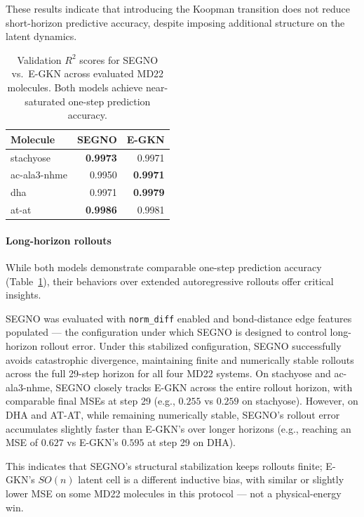 \documentclass{article}
\begin{document}
These results indicate that introducing the Koopman transition does not reduce short-horizon predictive accuracy, despite imposing additional structure on the latent dynamics.

\begin{table}[htbp]
\centering
\begin{tabular}{lrr}
\toprule
\textbf{Molecule} & \textbf{SEGNO} & \textbf{E-GKN} \\
\midrule
stachyose & \textbf{0.9973} & 0.9971 \\
ac-ala3-nhme & 0.9950 & \textbf{0.9971} \\
dha & 0.9971 & \textbf{0.9979} \\
at-at & \textbf{0.9986} & 0.9981 \\
\bottomrule
\end{tabular}
\caption{Validation $R^2$ scores for SEGNO vs.\ E-GKN across evaluated MD22 molecules. Both models achieve near-saturated one-step prediction accuracy.}
\label{tab:segno_r2}
\end{table}

\paragraph{Long-horizon rollouts}
While both models demonstrate comparable one-step prediction accuracy (Table~\ref{tab:segno_r2}), their behaviors over extended autoregressive rollouts offer critical insights.

SEGNO was evaluated with \texttt{norm\_diff} enabled and bond-distance edge features populated --- the configuration under which SEGNO is designed to control long-horizon rollout error. Under this stabilized configuration, SEGNO successfully avoids catastrophic divergence, maintaining finite and numerically stable rollouts across the full 29-step horizon for all four MD22 systems. On stachyose and ac-ala3-nhme, SEGNO closely tracks E-GKN across the entire rollout horizon, with comparable final MSEs at step 29 (e.g., $0.255$ vs $0.259$ on stachyose). However, on DHA and AT-AT, while remaining numerically stable, SEGNO's rollout error accumulates slightly faster than E-GKN's over longer horizons (e.g., reaching an MSE of $0.627$ vs E-GKN's $0.595$ at step 29 on DHA).

This indicates that SEGNO's structural stabilization keeps rollouts finite; E-GKN's $SO(n)$ latent cell is a different inductive bias, with similar or slightly lower MSE on some MD22 molecules in this protocol --- not a physical-energy win.
\end{document}
